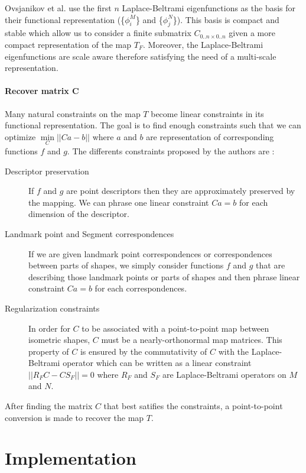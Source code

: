\documentclass[10pt,twocolumn,letterpaper]{article}
\begin{document}
Ovsjanikov et al. use the first $n$ Laplace-Beltrami eigenfunctions as the basis for their functional representation (\{$\phi_i^M$\} and \{$\phi_j^N$\}). This basis is compact and stable which allow us to consider a finite submatrix $C_{0..n \times 0..n}$ given a more compact representation of the map $T_F$. Moreover, the Laplace-Beltrami eigenfunctions are scale aware therefore satisfying the need of a multi-scale representation.

\paragraph{Recover matrix C} 
Many natural constraints on the map $T$ become linear constraints in its functional representation. The goal is to find enough constraints such that we can optimize $\underset{C}{\min}||Ca-b||$ where $a$ and $b$ are representation of corresponding functions $f$ and $g$. The differents constraints proposed by the authors are : 
\begin{description}
\item[Descriptor preservation] If $f$ and $g$ are point descriptors then they are approximately preserved by the mapping. We can phrase one linear constraint $Ca=b$ for each dimension of the descriptor.
\item[Landmark point and Segment correspondences] If we are given landmark point correspondences or correspondences between parts of shapes, we simply consider functions $f$ and $g$ that are describing those landmark points or parts of shapes and then phrase linear constraint $Ca=b$ for each correspondences.
\item[Regularization constraints] In order for $C$ to be associated with a point-to-point map between isometric shapes, $C$ must be a nearly-orthonormal map matrices. This property of $C$ is ensured by the commutativity of $C$ with the Laplace-Beltrami operator which can be written as a linear constraint $||R_FC-CS_F||=0$ where $R_F$ and $S_F$ are Laplace-Beltrami operators on $M$ and $N$.
\end{description}

After finding the matrix $C$ that best satifies the constraints, a point-to-point conversion is made to recover the map $T$.

\section{Implementation}
\end{document}

